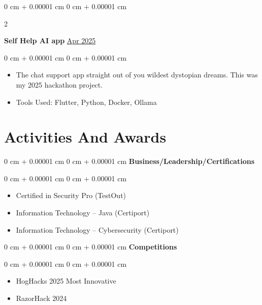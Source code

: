 \documentclass[10pt, letterpaper]{article}
\newenvironment{highlights}{
    \begin{itemize}[
        topsep=0.10 cm,
        parsep=0.10 cm,
        partopsep=0pt,
        itemsep=0pt,
        leftmargin=0 cm + 10pt
    ]
}{
    \end{itemize}
} %
\newenvironment{onecolentry}{
    \begin{adjustwidth}{
        0 cm + 0.00001 cm
    }{
        0 cm + 0.00001 cm
    }
}{
    \end{adjustwidth}
} %
\newenvironment{twocolentry}[2][]{
    \onecolentry
    \def\secondColumn{#2}
    \setcolumnwidth{\fill, 4.5 cm}
    \begin{paracol}{2}
}{
    \switchcolumn \raggedleft \secondColumn
    \end{paracol}
    \endonecolentry
} %
\begin{document}
      \vspace{0.1cm}
        \begin{twocolentry}{
            \href{https://github.com/andrewamidei/Hackathon-2025}{Apr 2025}

          }
        \textbf{Self Help AI app}\end{twocolentry}

        \vspace{0.10 cm}
        \begin{onecolentry}
          \begin{highlights}
          \item The chat support app straight out of you wildest dystopian dreams. This was my 2025 hackathon project.  
          \item Tools Used: Flutter, Python, Docker, Ollama
          \end{highlights}
        \end{onecolentry}


    
    \section{Activities And Awards}

        
        \begin{onecolentry}{
        }
            \textbf{Business/Leadership/Certifications}\end{onecolentry}

        \vspace{0.10 cm}
        \begin{onecolentry}
            \begin{highlights}
                \item Certified in Security Pro (TestOut)
                \item Information Technology – Java (Certiport)
                \item Information Technology – Cybersecurity (Certiport)
            \end{highlights}
        \end{onecolentry}
        \vspace{0.10 cm}
       \begin{onecolentry}{
        }
            \textbf{Competitions}\end{onecolentry}
            
        \vspace{0.10 cm}
        \begin{onecolentry}
            \begin{highlights}
                \item HogHacks 2025 Most Innovative
                \item RazorHack 2024 
            \end{highlights}
        \end{onecolentry}



  
\end{document}
